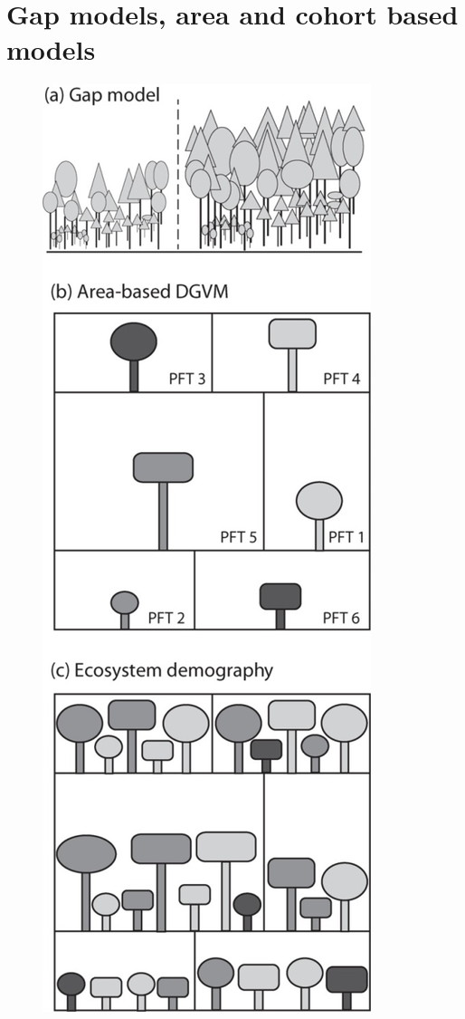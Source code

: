 \documentclass[
  12pt,
  oneside]{book}
\begin{document}
\hypertarget{gap-models-area-and-cohort-based-models}{%
\section{Gap models, area and cohort based models}\label{gap-models-area-and-cohort-based-models}}

\begin{figure}

{\centering \includegraphics[width=0.8\linewidth]{figures/chap6/f63_3types} 

}
\end{figure}
\end{document}
